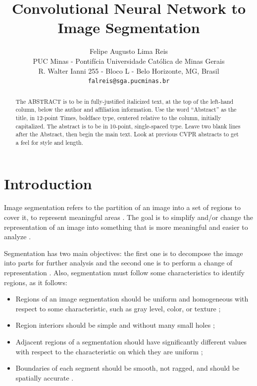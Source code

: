 \documentclass[10pt,twocolumn,letterpaper]{article}
\begin{document}
\title{Convolutional Neural Network to Image Segmentation}

\author{Felipe Augusto Lima Reis\\
PUC Minas - Pontif\'icia Universidade Cat\'olica de Minas Gerais\\
R. Walter Ianni 255 - Bloco L - Belo Horizonte, MG, Brasil\\
{\tt\small falreis@sga.pucminas.br}
}

\maketitle

\begin{abstract}
   The ABSTRACT is to be in fully-justified italicized text, at the top
   of the left-hand column, below the author and affiliation
   information. Use the word ``Abstract'' as the title, in 12-point
   Times, boldface type, centered relative to the column, initially
   capitalized. The abstract is to be in 10-point, single-spaced type.
   Leave two blank lines after the Abstract, then begin the main text.
   Look at previous CVPR abstracts to get a feel for style and length.
\end{abstract}

\section{Introduction}

Image segmentation refers to the partition of an image into a set of regions to cover it, to represent meaningful areas \cite{DOMINGUEZ}. The goal is to simplify and/or change the representation of an image into something
that is more meaningful and easier to analyze \cite{AHMED_SARMA}.

Segmentation has two main objectives: the first one is to decompose the image into parts for further analysis and the second one is to perform a change of representation \cite{DOMINGUEZ}. Also, segmentation must follow some characteristics to identify regions, as it follows:

\begin{itemize}
 \item Regions of an image segmentation should be uniform and homogeneous with respect to some characteristic, such as gray level, color, or texture \cite{DOMINGUEZ};
 \item Region interiors should be simple and without many small holes \cite{DOMINGUEZ};
 \item Adjacent regions of a segmentation should have significantly different values with respect to the characteristic on which they are uniform \cite{DOMINGUEZ};
 \item Boundaries of each segment should be smooth, not ragged, and should be spatially accurate \cite{DOMINGUEZ}.
\end{itemize}
\end{document}
